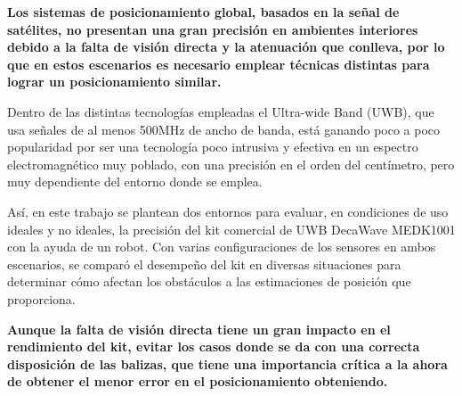 \textbf{Los sistemas de posicionamiento global, basados en la señal de satélites, no presentan una gran precisión en ambientes interiores debido a la falta de visión directa y la atenuación que conlleva, por lo que en estos escenarios es necesario emplear técnicas distintas para lograr un posicionamiento similar.}

Dentro de las distintas tecnologías empleadas el Ultra-wide Band (UWB), que usa señales de al menos 500MHz de ancho de banda, está ganando poco a poco popularidad por ser una tecnología poco intrusiva y efectiva en un espectro electromagnético muy poblado, con una precisión en el orden del centímetro, pero muy dependiente del entorno donde se emplea.

Así, en este trabajo se plantean dos entornos para evaluar, en condiciones de uso ideales y no ideales, la precisión del kit comercial de UWB DecaWave MEDK1001 con la ayuda de un robot.
Con varias configuraciones de los sensores en ambos escenarios, se comparó el desempeño del kit en diversas situaciones para determinar cómo afectan los obstáculos a las estimaciones de posición que proporciona.

\textbf{Aunque la falta de visión directa tiene un gran impacto en el rendimiento del kit, evitar los casos donde se da con una correcta disposición de las balizas, que tiene una importancia crítica a la ahora de obtener el menor error en el posicionamiento obteniendo.}